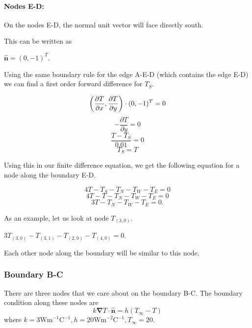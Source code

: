 \documentclass[12pt,a4paper]{article}
\begin{document}
\paragraph*{Nodes E-D:} On the nodes E-D, the normal unit vector will face directly south. 
\begin{center}
\end{center}
This can be written as 
\begin{center}
  $\hat{\textbf{n}}=(0,-1)^T$.
\end{center}
Using the same boundary rule for the edge A-E-D (which contains the edge E-D) we can find a first order forward difference for $T_S$.
\begin{center}
\[\bigg{(}\frac{\partial T}{\partial x},\frac{\partial T}{\partial y}\bigg{)}\cdot (0,-1)^T = 0\]
\[-\frac{\partial T}{\partial y}=0\]
\[\frac{T-T_S}{0.01}=0\]
\[T_S=T\]
\end{center} 
Using this in our finite difference equation, we get the following equation for a node along the boundary E-D.
\begin{center}
  \[4T-T_S-T_N-T_W-T_E=0\]
  \[4T-T-T_N-T_W-T_E=0\]
  \[3T-T_N-T_W-T_E=0.\]
\end{center}
As an example, let us look at node $T_{(3,0)}$.
\begin{center}
  $3T_{(3,0)}-T_{(3,1)}-T_{(2,0)}-T_{(4,0)}=0$.
\end{center}
Each other node along the boundary will be similar to this node.
\subsubsection{Boundary B-C}
There are three nodes that we care about on the boundary B-C. The boundary condition along these nodes are
\[k\boldsymbol{\nabla}T\cdot\hat{\textbf{n}} = h(T_{\infty} - T)\]
where $k=3\text{Wm}^{-1}\text{C}^{-1}, h=20\text{Wm}^{-2}\text{C}^{-1}, T_\infty=20$.
\end{document}
